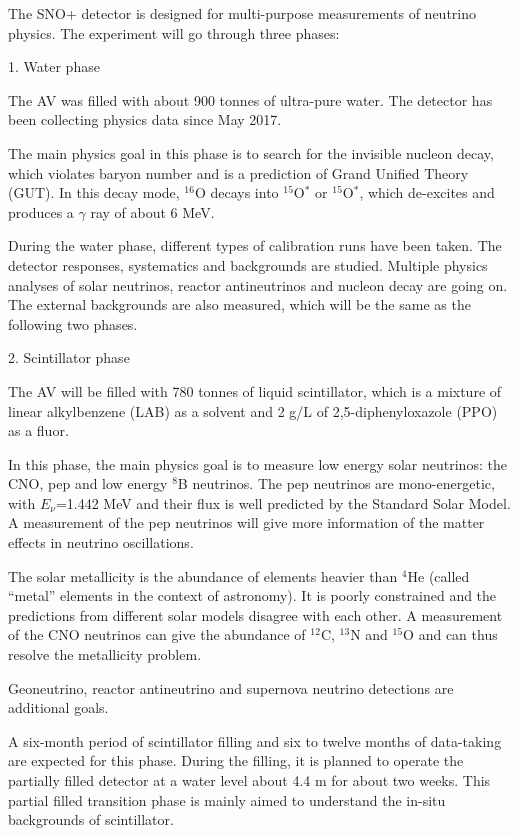 \documentclass[preprint,12pt]{elsarticle}
\numberwithin{equation}{section}
\begin{document}
The SNO+ detector is designed for multi-purpose measurements of neutrino physics.
The experiment will go through three phases\cite{whitepaper}: 

1. Water phase 

The AV was filled with about 900 tonnes of ultra-pure water. The detector has been collecting physics data since May 2017.

The main physics goal in this phase is to search for the invisible nucleon decay, which violates baryon number and is a prediction of Grand Unified Theory (GUT). In this decay mode, $^{16}$O decays into $^{15}$O$^*$ or $ ^{15}$O$^*$, which de-excites and produces a $\gamma$ ray of about 6 MeV.

During the water phase, different types of calibration runs have been taken. The detector responses, systematics and backgrounds are studied. Multiple physics analyses of solar neutrinos, reactor antineutrinos and nucleon decay are going on. The external backgrounds are also measured, which will be the same as the following two phases. 

2. Scintillator phase

The AV will be filled with 780 tonnes of liquid scintillator, which is a mixture of linear alkylbenzene (LAB) as a solvent and 2 g/L of 2,5-diphenyloxazole (PPO) as a fluor.

In this phase, the main physics goal is to measure low energy solar neutrinos: the CNO, pep and low energy $^8$B neutrinos. The pep neutrinos are mono-energetic, with $E_\nu$=1.442 MeV and their flux is well predicted by the Standard Solar Model. A measurement of the pep neutrinos will give more information of the matter effects in neutrino oscillations\cite{borexino}. 

The solar metallicity is the abundance of elements heavier than $^4$He (called ``metal'' elements in the context of astronomy). It is poorly constrained and the predictions from different solar models disagree with each other. A measurement of the CNO neutrinos can give the abundance of $^{12}$C, $^{13}$N and $^{15}$O and can thus resolve the metallicity problem\cite{cno}.

Geoneutrino, reactor antineutrino and supernova neutrino detections are additional goals.

A six-month period of scintillator filling and six to twelve months of data-taking are expected for this phase. During the filling, it is planned to operate the partially filled detector at a water level about 4.4 m for about two weeks. This partial filled transition phase is mainly aimed to understand the in-situ backgrounds of scintillator. 
\end{document}
